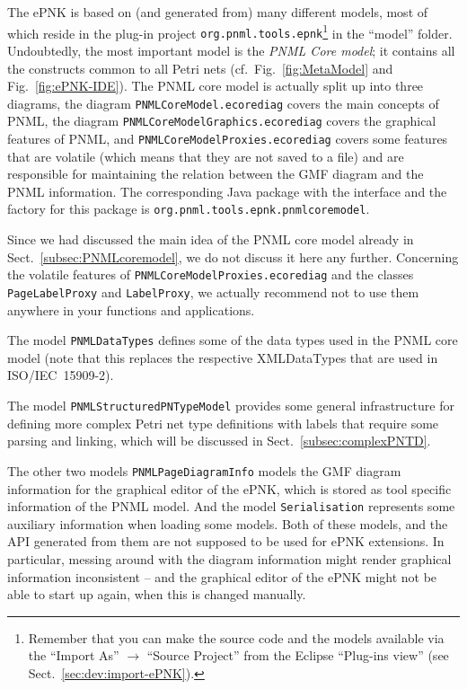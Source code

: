 %
The ePNK is based on (and generated from) many different models, most of
which reside in the plug-in project {\tt org.pnml.tools.epnk}\footnote
  {Remember that you can make the source code and the models available
   via the ``Import As'' $\rightarrow$ ``Source Project'' from the
   Eclipse ``Plug-ins view'' (see Sect.~\ref{sec:dev:import-ePNK}).}
in the ``model'' folder. Undoubtedly, the most important model is the
\emph{PNML Core model}; it contains all the constructs common to all
Petri nets (cf.\ Fig.~\ref{fig:MetaModel} and Fig.~\ref{fig:ePNK-IDE}).
The PNML core model is actually split up into three diagrams, the diagram
{\tt PNMLCoreModel.ecorediag} covers the main concepts of PNML, the
diagram {\tt PNMLCoreModelGraphics.ecorediag} covers the graphical features
of PNML, and {\tt PNMLCoreModelProxies.ecorediag} covers some features
that are volatile (which means that they are not saved to a file) and
are responsible for maintaining the relation between the GMF diagram
and the PNML information. The corresponding Java package with the interface
and the factory for this package is {\tt org.pnml.tools.epnk.pnmlcoremodel}.

Since we had discussed the main idea of the PNML core model already in
Sect.~\ref{subsec:PNMLcoremodel}, we do not discuss it here any further.
Concerning the volatile features of  {\tt PNMLCoreModelProxies.ecorediag}
and the classes {\tt PageLabelProxy} and {\tt LabelProxy}, we actually
recommend not to use them anywhere in your functions and applications.

The model {\tt PNMLDataTypes} defines some of the data types used in
the PNML core model (note that this replaces the respective XMLDataTypes
that are used in ISO/IEC~15909-2).%

The model {\tt PNMLStructuredPNTypeModel} provides some general infrastructure
for defining more complex Petri net type definitions with labels that require
some parsing and linking, which will be discussed in Sect.~\ref{subsec:complexPNTD}.

The other two models {\tt PNMLPageDiagramInfo} models the GMF diagram information
for the graphical editor of the ePNK, which is stored as tool specific
information of the PNML model. And the model {\tt Serialisation} represents some auxiliary
information when loading some models. Both of these models, and the API
generated from them are not supposed to be used for ePNK extensions. In particular,
messing around with the diagram information might render graphical information
inconsistent -- and the graphical editor of the ePNK might not be able to start
up again, when this is changed manually. 

